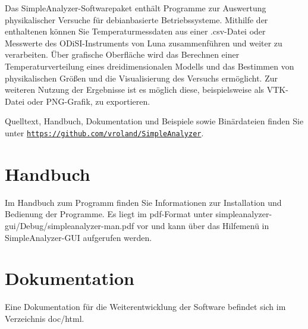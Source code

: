 Das Simple\-Analyzer-\/\-Softwarepaket enthält Programme zur Auswertung physikalischer Versuche für debianbasierte Betriebssysteme. Mithilfe der enthaltenen können Sie Temperaturmessdaten aus einer .csv-\/\-Datei oder Messwerte des O\-Di\-S\-I-\/\-Instruments von Luna zusammenführen und weiter zu verarbeiten. Über grafische Oberfläche wird das Berechnen einer Temperaturverteilung eines dreidimensionalen Modells und das Bestimmen von physikalischen Größen und die Visualisierung des Versuchs ermöglicht. Zur weiteren Nutzung der Ergebnisse ist es möglich diese, beispielsweise als V\-T\-K-\/\-Datei oder P\-N\-G-\/\-Grafik, zu exportieren.

Quelltext, Handbuch, Dokumentation und Beispiele sowie Binärdateien finden Sie unter \href{https://github.com/vroland/SimpleAnalyzer}{\tt https\-://github.\-com/vroland/\-Simple\-Analyzer}.

\section*{Handbuch }

Im Handbuch zum Programm finden Sie Informationen zur Installation und Bedienung der Programme. Es liegt im pdf-\/\-Format unter simpleanalyzer-\/gui/\-Debug/simpleanalyzer-\/man.\-pdf vor und kann über das Hilfemenü in Simple\-Analyzer-\/\-G\-U\-I aufgerufen werden.

\section*{Dokumentation }

Eine Dokumentation für die Weiterentwicklung der Software befindet sich im Verzeichnis doc/html. 